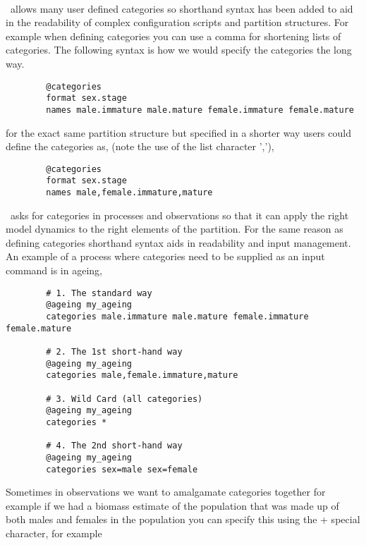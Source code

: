 \paragraph*{\label{sub:categories}}

\CNAME\ allows many user defined categories so shorthand syntax has been added to aid in the readability of complex configuration scripts and partition structures. For example when defining categories you can use a comma for shortening lists of categories. The following syntax is how we would specify the categories the long way.

{\small{\begin{verbatim}
		@categories 
		format sex.stage
		names male.immature male.mature female.immature female.mature		
		\end{verbatim}}}	

for the exact same partition structure but specified in a shorter way users could define the categories as, (note the use of the list character ','),

{\small{\begin{verbatim}
		@categories 
		format sex.stage
		names male,female.immature,mature	
		\end{verbatim}}}

\CNAME\ asks for categories in processes and observations so that it can apply the right model dynamics to the right elements of the partition. For the same reason as defining categories shorthand syntax aids in readability and input management. An example of a process where categories need to be supplied as an input command is in ageing,

{\small{\begin{verbatim}
		# 1. The standard way
		@ageing my_ageing
		categories male.immature male.mature female.immature female.mature
		
		# 2. The 1st short-hand way
		@ageing my_ageing
		categories male,female.immature,mature
		
		# 3. Wild Card (all categories)
		@ageing my_ageing
		categories *
		
		# 4. The 2nd short-hand way
		@ageing my_ageing
		categories sex=male sex=female
		\end{verbatim}}}

Sometimes in observations we want to amalgamate categories together for example if we had a biomass estimate of the population that was made up of both males and females in the population you can specify this using the + special character, for example

